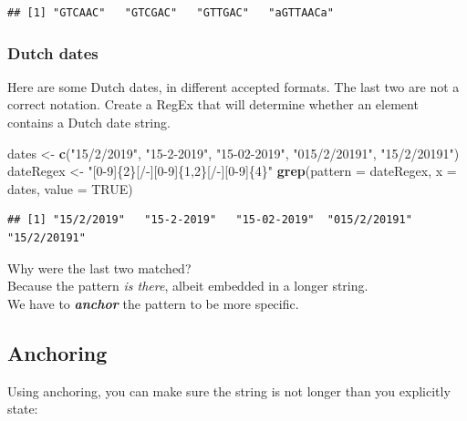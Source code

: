 \documentclass[]{book}
\newenvironment{Shaded}{\begin{snugshade}}{\end{snugshade}}
\newcommand{\DataTypeTok}[1]{\textcolor[rgb]{0.13,0.29,0.53}{#1}}
\newcommand{\KeywordTok}[1]{\textcolor[rgb]{0.13,0.29,0.53}{\textbf{#1}}}
\newcommand{\NormalTok}[1]{#1}
\newcommand{\OtherTok}[1]{\textcolor[rgb]{0.56,0.35,0.01}{#1}}
\newcommand{\StringTok}[1]{\textcolor[rgb]{0.31,0.60,0.02}{#1}}
\begin{document}
\begin{verbatim}
## [1] "GTCAAC"   "GTCGAC"   "GTTGAC"   "aGTTAACa"
\end{verbatim}

\hypertarget{dutch-dates}{%
\subsubsection*{Dutch dates}\label{dutch-dates}}

Here are some Dutch dates, in different accepted formats. The last two are not a correct notation.
Create a RegEx that will determine whether an element contains a Dutch date string.

\begin{Shaded}
\begin{Highlighting}[]
\NormalTok{dates <-}\StringTok{ }\KeywordTok{c}\NormalTok{(}\StringTok{"15/2/2019"}\NormalTok{, }\StringTok{"15-2-2019"}\NormalTok{, }\StringTok{"15-02-2019"}\NormalTok{, }\StringTok{"015/2/20191"}\NormalTok{, }\StringTok{"15/2/20191"}\NormalTok{)}
\NormalTok{dateRegex <-}\StringTok{ "[0-9]\{2\}[/-][0-9]\{1,2\}[/-][0-9]\{4\}"}
\KeywordTok{grep}\NormalTok{(}\DataTypeTok{pattern =}\NormalTok{ dateRegex, }\DataTypeTok{x =}\NormalTok{ dates, }\DataTypeTok{value =} \OtherTok{TRUE}\NormalTok{)}
\end{Highlighting}
\end{Shaded}

\begin{verbatim}
## [1] "15/2/2019"   "15-2-2019"   "15-02-2019"  "015/2/20191" "15/2/20191"
\end{verbatim}

Why were the last two matched?\\
Because the pattern \emph{is there}, albeit embedded in a longer string.\\
We have to \textbf{\emph{anchor}} the pattern to be more specific.

\hypertarget{anchoring}{%
\subsection{Anchoring}\label{anchoring}}

Using anchoring, you can make sure the string is not longer than you explicitly state:

\begin{Shaded}
\end{Shaded}
\end{document}
